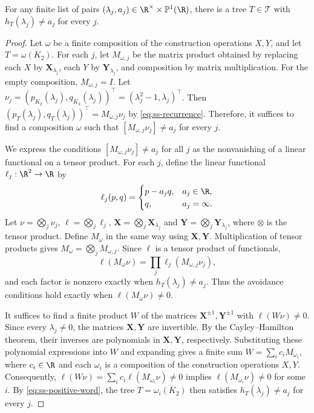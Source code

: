\begin{lemma}\label{lem:ss-caterpillars}
For any finite list of pairs
$(\lambda_j,a_j)\in\R^\times\times\mathbb P^1(\R)$, there is a tree
$T\in\mathcal T$ with $h_T(\lambda_j)\ne a_j$
for every $j$.
\end{lemma}
\begin{proof}
Let $\omega$ be a finite composition of the construction operations
$X,Y$, and let $T=\omega(K_2)$.
For each $j$, let $M_{\omega,j}$ be the matrix product obtained by
replacing each $X$ by $\mathbf{X}_{\lambda_j}$, each $Y$ by
$\mathbf{Y}_{\lambda_j}$, and composition by matrix multiplication.
For the empty composition, $M_{\omega,j}=I$.
Let $\nu_j=(p_{K_2}(\lambda_j),q_{K_2}(\lambda_j))^{\top}
=(\lambda_j^2-1,\lambda_j)^{\top}$.
Then $(p_T(\lambda_j),q_T(\lambda_j))^{\top}=M_{\omega,j}\nu_j$
by \cref{eq:ss-recurrence}.
Therefore, it suffices to find a composition $\omega$ such that
$[M_{\omega,j}\nu_j]\ne a_j$ for every $j$.

We express the conditions $[M_{\omega,j}\nu_j]\ne a_j$ for all $j$
as the nonvanishing of a linear functional on a tensor product.
For each $j$, define the linear functional
$\ell_j:\R^2\to\R$ by
\begin{equation}\label{eq:ss-avoidance-factors}
 \ell_j(p,q)=
 \begin{cases}
  p-a_jq,&a_j\in\R,\\
  q,&a_j=\infty.
 \end{cases}
\end{equation}
Let
$\nu=\bigotimes_j\nu_j$, $\ell=\bigotimes_j\ell_j$,
$\mathbf{X}=\bigotimes_j\mathbf{X}_{\lambda_j}$ and
$\mathbf{Y}=\bigotimes_j\mathbf{Y}_{\lambda_j}$,
where $\otimes$ is the tensor product.
Define $M_\omega$ in the same way using $\mathbf{X},\mathbf{Y}$.
Multiplication of tensor products gives
$M_\omega=\bigotimes_jM_{\omega,j}$.
Since $\ell$ is a tensor product of functionals,
\begin{equation}\label{eq:ss-positive-word}
 \ell(M_\omega\nu)=\prod_j\ell_j(M_{\omega,j}\nu_j),
\end{equation}
and each factor is nonzero exactly when
$h_T(\lambda_j)\ne a_j$.
Thus the avoidance conditions hold exactly when $\ell(M_\omega\nu)\ne0$.

It suffices to find a finite product $W$ of the matrices
$\mathbf{X}^{\pm1},\mathbf{Y}^{\pm1}$ with $\ell(W\nu)\ne0$.
Since every $\lambda_j\ne0$, the matrices $\mathbf{X},\mathbf{Y}$ are
invertible. By the Cayley--Hamilton theorem, their inverses are
polynomials in $\mathbf{X},\mathbf{Y}$, respectively.
Substituting these polynomial expressions into $W$ and expanding gives
a finite sum $W=\sum_i c_iM_{\omega_i}$, where $c_i\in\R$ and each
$\omega_i$ is a composition of the construction operations $X,Y$.
Consequently, $\ell(W\nu)=\sum_i c_i\ell(M_{\omega_i}\nu)\ne0$
implies $\ell(M_{\omega_i}\nu)\ne0$ for some $i$.
By \cref{eq:ss-positive-word}, the tree $T=\omega_i(K_2)$ then satisfies
$h_T(\lambda_j)\ne a_j$ for every $j$.


\end{proof}
